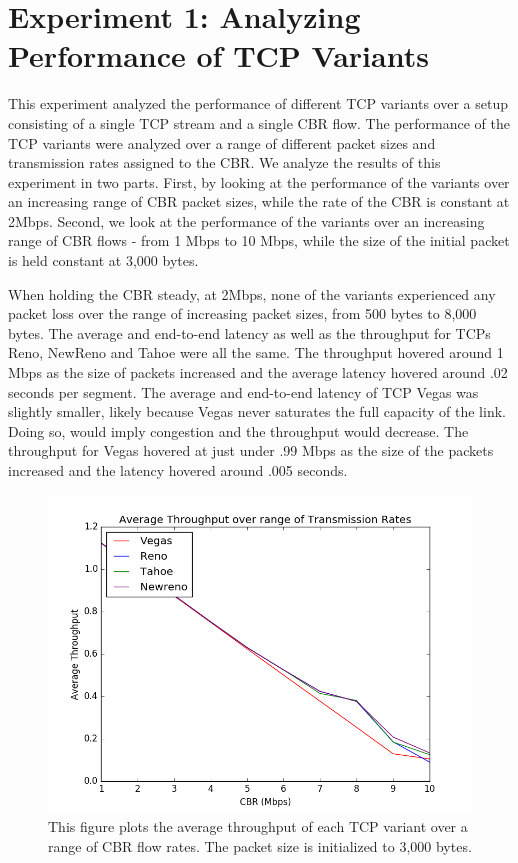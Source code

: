 \section{Experiment 1: Analyzing Performance of TCP Variants}

This experiment analyzed the performance of different TCP variants over a setup consisting of a single TCP stream and a single CBR flow. The performance of the TCP variants were analyzed over a range of different packet sizes and transmission rates assigned to the CBR. We analyze the results of this experiment in two parts. First, by looking at the performance of the variants over an increasing range of CBR packet sizes, while the rate of the CBR is constant at 2Mbps. Second, we look at the performance of the variants over an increasing range of CBR flows - from 1 Mbps to 10 Mbps, while the size of the initial packet is held constant at 3,000 bytes.

When holding the CBR steady, at 2Mbps, none of the variants experienced any packet loss over the range of increasing packet sizes, from 500 bytes to 8,000 bytes. The average and end-to-end latency as well as the throughput for TCPs  Reno, NewReno and Tahoe were all the same. The throughput hovered around 1 Mbps as the size of packets increased and the average latency hovered around .02 seconds per segment. The average and end-to-end latency of TCP Vegas was slightly smaller, likely because Vegas never saturates the full capacity of the link. Doing so, would imply congestion and the throughput would decrease. The throughput for Vegas hovered at just under .99 Mbps as the size of the packets increased and the latency hovered around .005 seconds.

\begin{figure}[!htbp]
	\includegraphics[scale=0.4]{P1.png}
	\caption{This figure plots the average throughput of each TCP variant over a range of CBR flow rates. The packet size is initialized to 3,000 bytes.}
	\label{a:label}
\end{figure}


